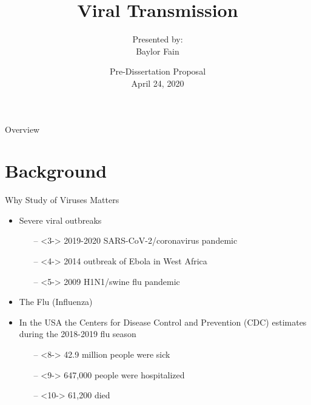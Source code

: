 \documentclass{beamer}
\title%
{{\Huge Viral Transmission}}
\author%
{{Presented by:\\ \large Baylor Fain}}%
\date%
{{\footnotesize Pre-Dissertation Proposal \\ April 24, 2020}}
\begin{document}
\begin{frame}
  \titlepage
\end{frame}

\begin{frame}{Overview}
  \tableofcontents%
\end{frame}

\section{Background}

\begin{frame}{Why Study of Viruses Matters}

    \begin{itemize}
        \item<2-> Severe viral outbreaks 
            \begin{itemize}
                \item[--]<3-> 2019-2020 SARS-CoV-2/coronavirus pandemic
                \item[--]<4-> 2014 outbreak of Ebola in West Africa
                \item[--]<5-> 2009 H1N1/swine flu pandemic
            \end{itemize} 
    \end{itemize}

    \begin{itemize}
        \item<6-> The Flu (Influenza)
    \end{itemize}

    \begin{itemize}
        \item<7-> In the USA the Centers for Disease Control and Prevention (CDC) estimates during the 2018-2019 flu season
        \begin{itemize}
            \item[--]<8-> 42.9 million people were sick
            \item[--]<9-> 647,000 people were hospitalized
            \item[--]<10-> 61,200 died
        \end{itemize} 
    \end{itemize}

\end{frame}
\end{document}
